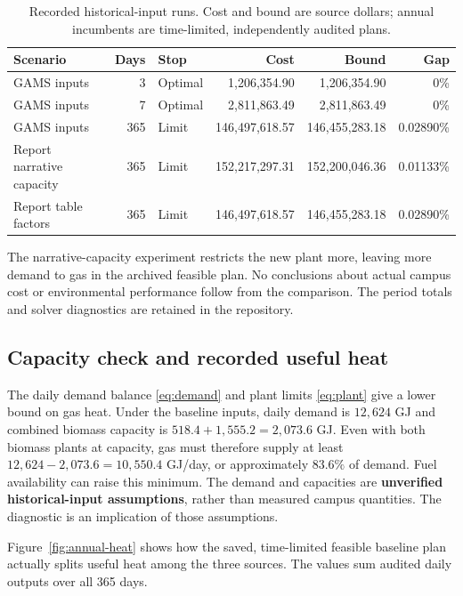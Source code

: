 \documentclass[11pt,a4paper]{article}
\begin{document}
\begin{table}[htbp]
\small
\caption{Recorded historical-input runs. Cost and bound are source dollars;
annual incumbents are time-limited, independently audited plans.}
\label{tab:annual}
\begin{tabularx}{\textwidth}{@{}Yrlrrr@{}}
\toprule Scenario & Days & Stop & Cost & Bound & Gap\\ \midrule
GAMS inputs & 3 & Optimal & 1,206,354.90 & 1,206,354.90 & 0\%\\
GAMS inputs & 7 & Optimal & 2,811,863.49 & 2,811,863.49 & 0\%\\
GAMS inputs & 365 & Limit & 146,497,618.57 & 146,455,283.18 & 0.02890\%\\
Report narrative capacity & 365 & Limit & 152,217,297.31 & 152,200,046.36 & 0.01133\%\\
Report table factors & 365 & Limit & 146,497,618.57 & 146,455,283.18 & 0.02890\%\\
\bottomrule
\end{tabularx}
\end{table}
The narrative-capacity experiment restricts the new plant more, leaving more
demand to gas in the archived feasible plan. No conclusions about actual campus
cost or environmental performance follow from the comparison. The period totals
and solver diagnostics are retained in the repository.

\subsection{Capacity check and recorded useful heat}
The daily demand balance \eqref{eq:demand} and plant limits \eqref{eq:plant}
give a lower bound on gas heat. Under the baseline inputs, daily demand is
\(12{,}624\) GJ and combined biomass capacity is
\(518.4+1{,}555.2=2{,}073.6\) GJ. Even with both biomass plants at capacity,
gas must therefore supply at least \(12{,}624-2{,}073.6=10{,}550.4\) GJ/day,
or approximately \(83.6\%\) of demand. Fuel availability can raise this
minimum. The demand and capacities are \textbf{unverified historical-input
assumptions}, rather than measured campus quantities. The diagnostic is
an implication of those assumptions.

Figure~\ref{fig:annual-heat} shows how the saved, time-limited feasible
baseline plan actually splits useful heat among the three sources. The
values sum audited daily outputs over all 365 days.
\end{document}
